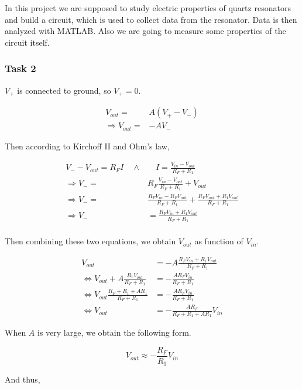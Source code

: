 \documentclass[12pt]{article}
\begin{document}
In this project we are supposed to study electric properties of quartz resonators and build a circuit, which is used to collect data from the resonator. Data is then analyzed with MATLAB. Also we are going to measure some properties of the circuit itself.

\subsubsection{Task 2} \label{sec:voltamp}

$V_+$ is connected to ground, so $V_+ = 0$.

\begin{align*}
V_{out} =& A(V_+ - V_-) \\
\Rightarrow V_{out} =& -AV_-
\end{align*}

Then according to Kirchoff II and Ohm's law,

\begin{align*}
V_- - V_{out} = R_F I \quad \wedge & \quad I = \frac{V_{in} - V_{out}}{R_F + R_1} \\
\Rightarrow V_- =& R_F \frac{V_{in} - V_{out}}{R_F + R_1} + V_{out} \\
\Rightarrow V_- =& \frac{R_F V_{in} - R_F V_{out}}{R_F + R_1} + \frac{R_F V_{out} + R_1 V_{out}}{R_F + R_1} \\
\Rightarrow V_- &= \frac{R_F V_{in} + R_1 V_{out}}{R_F + R_1} \\
\end{align*}

Then combining these two equations, we obtain $V_{out}$ as function of $V_{in}$.

\begin{align*}
V_{out} &= -A\frac{R_F V_{in} + R_1 V_{out}}{R_F + R_1} \\
\Leftrightarrow V_{out} + A\frac{R_1 V_{out}}{R_F + R_1} &= -\frac{A R_F V_{in}}{R_F + R_1} \\
\Leftrightarrow V_{out}\frac{R_F + R_1 + A R_1}{R_F + R_1} &= -\frac{A R_F V_{in}}{R_F + R_1} \\
\Leftrightarrow V_{out} &= -\frac{A R_F}{R_F + R_1 + A R_1} V_{in}
\end{align*}

When $A$ is very large, we obtain the following form.

\begin{equation*}
V_{out} \approx -\frac{R_F}{R_1} V_{in}
\end{equation*}

And thus,
\end{document}

